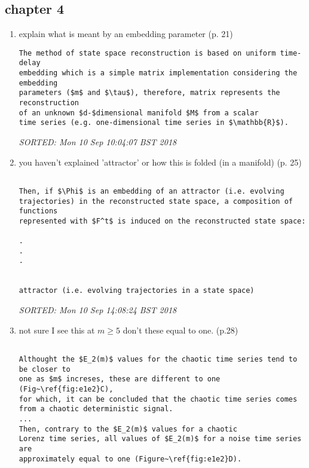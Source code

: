 \documentclass[10pt]{article}
\begin{document}
\subsection{chapter 4}


\begin{enumerate}[noitemsep,topsep=0pt]
\item explain what is meant by an embedding parameter (p. 21)

\begin{verbatim}
The method of state space reconstruction is based on uniform time-delay 
embedding which is a simple matrix implementation considering the embedding 
parameters ($m$ and $\tau$), therefore, matrix represents the reconstruction
of an unknown $d-$dimensional manifold $M$ from a scalar 
time series (e.g. one-dimensional time series in $\mathbb{R}$).
\end{verbatim}
\textit{
SORTED: Mon 10 Sep 10:04:07 BST 2018
}



\item you haven't explained 'attractor' or how this is folded
	(in a manifold) (p. 25)

\begin{verbatim}

Then, if $\Phi$ is an embedding of an attractor (i.e. evolving 
trajectories) in the reconstructed state space, a composition of functions 
represented with $F^t$ is induced on the reconstructed state space:

.
.
.


attractor (i.e. evolving trajectories in a state space) 
\end{verbatim}
\textit{
SORTED: Mon 10 Sep 14:08:24 BST 2018
}
\\




\item not sure I see this at $m \geq 5$ don't these equal to one. (p.28)

\begin{verbatim}

Althought the $E_2(m)$ values for the chaotic time series tend to be closer to
one as $m$ increses, these are different to one (Fig~\ref{fig:e1e2}C), 
for which, it can be concluded that the chaotic time series comes 
from a chaotic deterministic signal.
...
Then, contrary to the $E_2(m)$ values for a chaotic 
Lorenz time series, all values of $E_2(m)$ for a noise time series are 
approximately equal to one (Figure~\ref{fig:e1e2}D). 



\end{verbatim}
\end{enumerate}
\end{document}
